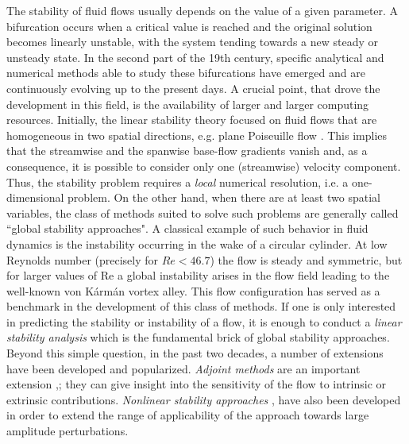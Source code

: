 \documentclass[twocolumn,10pt]{asme2ej}
\begin{document}
The stability of fluid flows usually depends on the value of a given parameter. A bifurcation occurs when a critical value is reached and the original solution becomes linearly unstable, with the system tending towards a new steady or unsteady state. 
In the second part of the 19th century, specific analytical and numerical methods able to study these bifurcations have emerged and are continuously evolving up to the present days. 
A crucial point, that drove the development in this field, is the availability of larger and larger computing resources. 
Initially, the linear stability theory focused on fluid flows that are homogeneous in two spatial directions, e.g. plane Poiseuille flow \cite{Dreid2004}. This implies that the streamwise and the spanwise base-flow gradients vanish and, as a consequence, it is possible to consider only one (streamwise) velocity component. Thus, the stability problem requires a \textit{local} numerical resolution, i.e. a one-dimensional problem.
On the other hand,  when there are at least two spatial variables, the class of methods suited to solve such problems are generally called ``global stability approaches".
A classical example of such behavior in fluid dynamics is the instability occurring in the wake of a circular cylinder. At low Reynolds number (precisely for $Re < 46.7$) the flow is steady and symmetric, but for larger values of Re a global instability arises in the flow field leading to the well-known von K\'arm\'an vortex alley. 
This flow configuration has served as a benchmark in the development of this class of methods.  
If one is only interested in predicting the stability or instability of a flow, it is enough to conduct a {\em linear stability analysis} which is the fundamental brick of global stability approaches. 
Beyond this simple question, in the past two decades, a number of extensions have been developed and popularized.  {\em Adjoint methods} are an important extension \cite{GiannettiLuchini},\cite{Marquet}; they can give insight into the sensitivity of the flow to intrinsic or extrinsic contributions. 
{\em Nonlinear stability approaches} \cite{MLugo2014}, \cite{SippLebedev} have also been developed in order to extend the range of applicability of the approach towards large amplitude perturbations.
\end{document}
